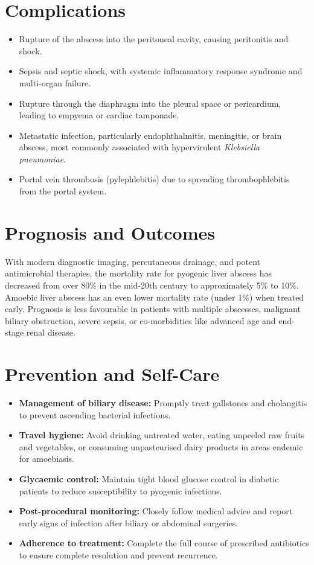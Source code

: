 \section*{Complications}
\begin{itemize}
    \item Rupture of the abscess into the peritoneal cavity, causing peritonitis and shock.
    \item Sepsis and septic shock, with systemic inflammatory response syndrome and multi-organ failure.
    \item Rupture through the diaphragm into the pleural space or pericardium, leading to empyema or cardiac tamponade.
    \item Metastatic infection, particularly endophthalmitis, meningitis, or brain abscess, most commonly associated with hypervirulent \textit{Klebsiella pneumoniae}.
    \item Portal vein thrombosis (pylephlebitis) due to spreading thrombophlebitis from the portal system.
\end{itemize}

\section*{Prognosis and Outcomes}
With modern diagnostic imaging, percutaneous drainage, and potent antimicrobial therapies, the mortality rate for pyogenic liver abscess has decreased from over 80\% in the mid-20th century to approximately 5\% to 10\%. Amoebic liver abscess has an even lower mortality rate (under 1\%) when treated early. Prognosis is less favourable in patients with multiple abscesses, malignant biliary obstruction, severe sepsis, or co-morbidities like advanced age and end-stage renal disease.

\section*{Prevention and Self-Care}
\begin{itemize}
    \item \textbf{Management of biliary disease:} Promptly treat gallstones and cholangitis to prevent ascending bacterial infections.
    \item \textbf{Travel hygiene:} Avoid drinking untreated water, eating unpeeled raw fruits and vegetables, or consuming unpasteurised dairy products in areas endemic for amoebiasis.
    \item \textbf{Glycaemic control:} Maintain tight blood glucose control in diabetic patients to reduce susceptibility to pyogenic infections.
    \item \textbf{Post-procedural monitoring:} Closely follow medical advice and report early signs of infection after biliary or abdominal surgeries.
    \item \textbf{Adherence to treatment:} Complete the full course of prescribed antibiotics to ensure complete resolution and prevent recurrence.
\end{itemize}

